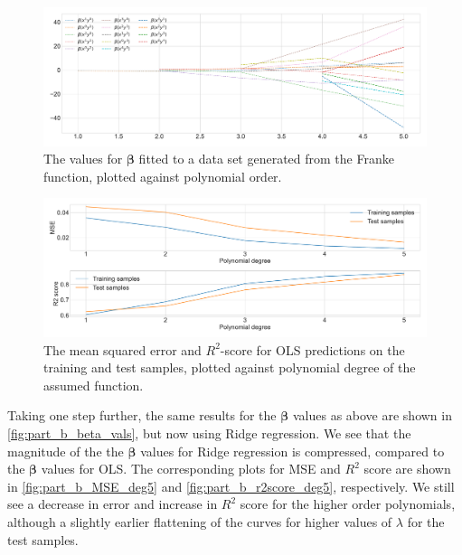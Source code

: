 \documentclass[12pt]{article}
\begin{document}
\begin{figure}
    \centering
    \includegraphics[width=1\linewidth]{images/part_a_beta_vals.pdf}
    \caption{The values for $\boldsymbol{\beta}$ fitted to a data set generated from the Franke function, plotted against polynomial order.}
    \label{fig:part_a_beta_vals}
\end{figure}

\begin{figure}
    \centering
    \includegraphics[width=1\linewidth]{images/part_a_MSE_and_r2score_deg5.pdf}
    \caption{The mean squared error and $R^2$-score for OLS predictions on the training and test samples, plotted against polynomial degree of the assumed function.}
    \label{fig:part_a_MSE_and_r2score_deg5}
\end{figure}

Taking one step further, the same results for the $\boldsymbol{\beta}$ values as above are shown in \autoref{fig:part_b_beta_vals}, but now using Ridge regression. We see that the magnitude of the the $\boldsymbol{\beta}$ values for Ridge regression is compressed, compared to the $\boldsymbol{\beta}$ values for OLS. The corresponding plots for MSE and $R^2$ score are shown in \autoref{fig:part_b_MSE_deg5} and \autoref{fig:part_b_r2score_deg5}, respectively. We still see a decrease in error and increase in $R^2$ score for the higher order polynomials, although a slightly earlier flattening of the curves for higher values of $\lambda$ for the test samples. 
\end{document}
